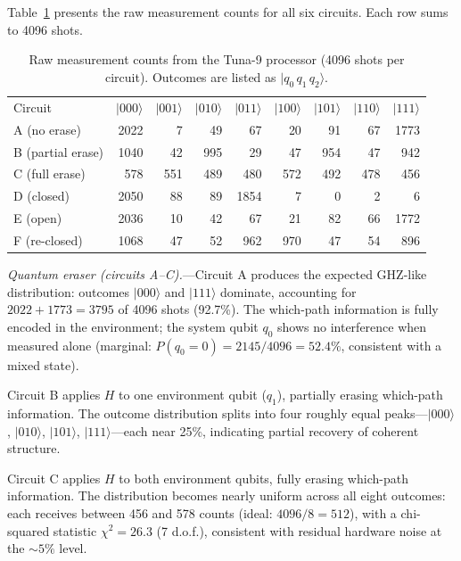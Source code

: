 \documentclass[prl,twocolumn,superscriptaddress,longbibliography,floatfix]{revtex4-2}
\newcommand{\ket}[1]{|#1\rangle}
\begin{document}
Table~\ref{tab:raw} presents the raw measurement counts for all six
circuits.  Each row sums to 4096 shots.

\begin{table}[t]
\caption{\label{tab:raw}Raw measurement counts from the Tuna-9
processor (4096 shots per circuit).  Outcomes are listed as
$\ket{q_0\,q_1\,q_2}$.}
\begin{ruledtabular}
\begin{tabular}{lrrrrrrrr}
\textrm{Circuit} & $\ket{000}$ & $\ket{001}$ & $\ket{010}$
  & $\ket{011}$ & $\ket{100}$ & $\ket{101}$ & $\ket{110}$ & $\ket{111}$ \\
\colrule
A (no erase)       & 2022 &    7 &   49 &   67 &   20 &   91 &   67 & 1773 \\
B (partial erase)  & 1040 &   42 &  995 &   29 &   47 &  954 &   47 &  942 \\
C (full erase)     &  578 &  551 &  489 &  480 &  572 &  492 &  478 &  456 \\
\colrule
D (closed)         & 2050 &   88 &   89 & 1854 &    7 &    0 &    2 &    6 \\
E (open)           & 2036 &   10 &   42 &   67 &   21 &   82 &   66 & 1772 \\
F (re-closed)      & 1068 &   47 &   52 &  962 &  970 &   47 &   54 &  896 \\
\end{tabular}
\end{ruledtabular}
\end{table}

\textit{Quantum eraser (circuits A--C).}---Circuit A produces the
expected GHZ-like distribution: outcomes $\ket{000}$ and $\ket{111}$
dominate, accounting for $2022+1773 = 3795$ of 4096 shots (92.7\%).
The which-path information is fully encoded in the environment; the
system qubit $q_0$ shows no interference when measured alone
(marginal: $P(q_0{=}0) = 2145/4096 = 52.4\%$, consistent with a
mixed state).

Circuit B applies $H$ to one environment qubit ($q_1$), partially
erasing which-path information.  The outcome distribution splits
into four roughly equal peaks---$\ket{000}$, $\ket{010}$,
$\ket{101}$, $\ket{111}$---each near 25\%, indicating partial
recovery of coherent structure.

Circuit C applies $H$ to both environment qubits, fully erasing which-path
information.  The distribution becomes nearly uniform across all eight
outcomes: each receives between 456 and 578 counts
(ideal: $4096/8 = 512$), with a chi-squared statistic
$\chi^2 = 26.3$ (7 d.o.f.), consistent with residual hardware noise
at the $\sim$$5\%$ level.
\end{document}
